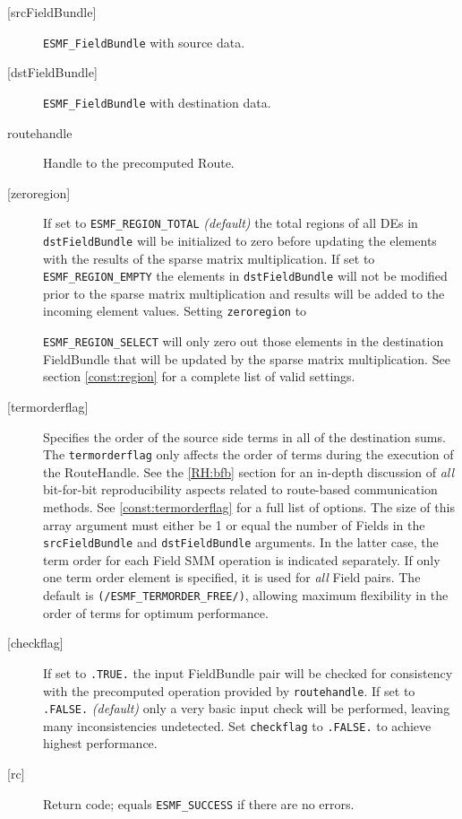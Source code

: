    \begin{description}
   \item [{[srcFieldBundle]}]
   {\tt ESMF\_FieldBundle} with source data.
   \item [{[dstFieldBundle]}]
   {\tt ESMF\_FieldBundle} with destination data.
   \item [routehandle]
   Handle to the precomputed Route.
   \item [{[zeroregion]}]
   If set to {\tt ESMF\_REGION\_TOTAL} {\em (default)} the total regions of
   all DEs in {\tt dstFieldBundle} will be initialized to zero before updating the
   elements with the results of the sparse matrix multiplication. If set to
   {\tt ESMF\_REGION\_EMPTY} the elements in {\tt dstFieldBundle} will not be
   modified prior to the sparse matrix multiplication and results will be
   added to the incoming element values. Setting {\tt zeroregion} to
  
   {\tt ESMF\_REGION\_SELECT} will only zero out those elements in the
   destination FieldBundle that will be updated by the sparse matrix
   multiplication. See section \ref{const:region} for a complete list of
   valid settings.
   \item [{[termorderflag]}]
   Specifies the order of the source side terms in all of the destination
   sums. The {\tt termorderflag} only affects the order of terms during
   the execution of the RouteHandle. See the \ref{RH:bfb} section for an
   in-depth discussion of {\em all} bit-for-bit reproducibility
   aspects related to route-based communication methods.
   See \ref{const:termorderflag} for a full list of options.
   The size of this array argument must either be 1 or equal the number of
   Fields in the {\tt srcFieldBundle} and {\tt dstFieldBundle} arguments. In
   the latter case, the term order for each Field SMM operation is
   indicated separately. If only one term order element is specified, it is
   used for {\em all} Field pairs.
   The default is {\tt (/ESMF\_TERMORDER\_FREE/)}, allowing maximum
   flexibility in the order of terms for optimum performance.
   \item [{[checkflag]}]
   If set to {\tt .TRUE.} the input FieldBundle pair will be checked for
   consistency with the precomputed operation provided by {\tt routehandle}.
   If set to {\tt .FALSE.} {\em (default)} only a very basic input check
   will be performed, leaving many inconsistencies undetected. Set
   {\tt checkflag} to {\tt .FALSE.} to achieve highest performance.
   \item [{[rc]}]
   Return code; equals {\tt ESMF\_SUCCESS} if there are no errors.
   \end{description}
   
